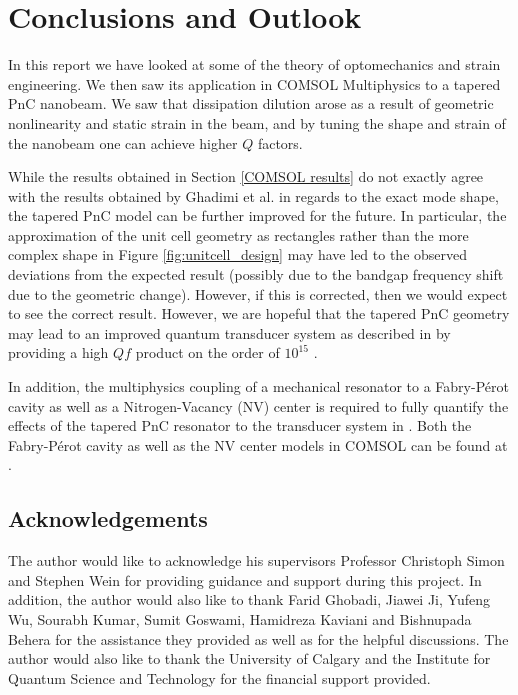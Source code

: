 \documentclass[%
 reprint,
nofootinbib,
 amsmath,amssymb,
 aps,
]{revtex4-2}
\begin{document}
\section{Conclusions and Outlook}\label{Conclusion}
In this report we have looked at some of the theory of optomechanics and strain engineering. We then saw its application in COMSOL Multiphysics to a tapered PnC nanobeam. We saw that dissipation dilution arose as a result of geometric nonlinearity and static strain in the beam, and by tuning the shape and strain of the nanobeam one can achieve higher $Q$ factors.
\newline

While the results obtained in Section \ref{COMSOL results} do not exactly agree with the results obtained by Ghadimi et al. \cite{ghadimi_main_paper} in regards to the exact mode shape, the tapered PnC model can be further improved for the future. In particular, the approximation of the unit cell geometry as rectangles rather than the more complex shape in Figure \ref{fig:unitcell_design} may have led to the observed deviations from the expected result (possibly due to the bandgap frequency shift due to the geometric change). However, if this is corrected, then we would expect to see the correct result. However, we are hopeful that the tapered PnC geometry may lead to an improved quantum transducer system as described in \cite{project_paper} by providing a high $Qf$ product on the order of $10^{15}$ \cite{ghadimi_main_paper}.
\newline

In addition, the multiphysics coupling of a mechanical resonator to a Fabry-P\'erot cavity as well as a Nitrogen-Vacancy (NV) center is required to fully quantify the effects of the tapered PnC resonator to the transducer system in \cite{project_paper}. Both the Fabry-P\'erot cavity as well as the NV center models in COMSOL can be found at \cite{fabry_perot_cavity, NV_center_fluorescence}.

\subsection{Acknowledgements}
The author would like to acknowledge his supervisors Professor Christoph Simon and Stephen Wein for providing guidance and support during this project. In addition, the author would also like to thank Farid Ghobadi, Jiawei Ji, Yufeng Wu, Sourabh Kumar, Sumit Goswami, Hamidreza Kaviani and Bishnupada Behera for the assistance they provided as well as for the helpful discussions. The author would also like to thank the University of Calgary and the Institute for Quantum Science and Technology for the financial support provided. 
\end{document}
